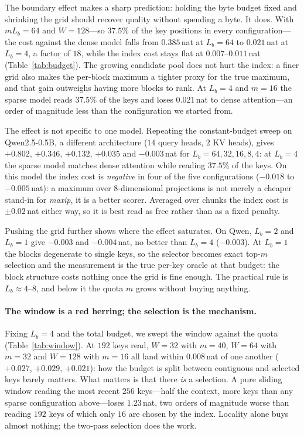 \documentclass[sigconf,nonacm,11pt]{acmart}
\begin{document}
The boundary effect makes a sharp prediction: holding the byte budget fixed and
shrinking the grid should recover quality without spending a byte. It does. With
$m L_b=64$ and $W=128$---so $37.5\%$ of the key positions in every
configuration---the cost against the dense model falls from $0.385$\,nat at
$L_b=64$ to $0.021$\,nat at $L_b=4$, a factor of $18$, while the index cost stays
flat at $0.007$--$0.011$\,nat (Table~\ref{tab:budget}). The growing candidate pool
does not hurt the index: a finer grid also makes the per-block maximum a tighter
proxy for the true maximum, and that gain outweighs having more blocks to rank. At
$L_b=4$ and $m=16$ the sparse model reads $37.5\%$ of the keys and loses
$0.021$\,nat to dense attention---an order of magnitude less than the
configuration we started from.

The effect is not specific to one model. Repeating the constant-budget sweep on
Qwen2.5-0.5B, a different architecture ($14$ query heads, $2$ KV heads), gives
$+0.802$, $+0.346$, $+0.132$, $+0.035$ and $-0.003$\,nat for
$L_b=64,32,16,8,4$: at $L_b=4$ the sparse model matches dense attention while
reading $37.5\%$ of the keys. On this model the index cost is \emph{negative} in
four of the five configurations ($-0.018$ to $-0.005$\,nat): a maximum over
$8$-dimensional projections is not merely a cheaper stand-in for \emph{maxip}, it
is a better scorer. Averaged over chunks the index cost is $\pm0.02$\,nat either
way, so it is best read as free rather than as a fixed penalty.

Pushing the grid further shows where the effect saturates. On Qwen, $L_b=2$ and
$L_b=1$ give $-0.003$ and $-0.004$\,nat, no better than $L_b=4$ ($-0.003$). At
$L_b=1$ the blocks degenerate to single keys, so the selector becomes exact
top-$m$ selection and the measurement is the true per-key oracle at that budget:
the block structure costs nothing once the grid is fine enough. The practical rule
is $L_b\approx4$--$8$, and below it the quota $m$ grows without buying anything.

\paragraph{The window is a red herring; the selection is the mechanism.} Fixing
$L_b=4$ and the total budget, we swept the window against the quota
(Table~\ref{tab:window}). At $192$ keys read, $W=32$ with $m=40$, $W=64$ with
$m=32$ and $W=128$ with $m=16$ all land within $0.008$\,nat of one another
($+0.027$, $+0.029$, $+0.021$): how the budget is split between contiguous and
selected keys barely matters. What matters is that there \emph{is} a selection. A
pure sliding window reading the most recent $256$ keys---half the context, more
keys than any sparse configuration above---loses $1.23$\,nat, two orders of
magnitude worse than reading $192$ keys of which only $16$ are chosen by the
index. Locality alone buys almost nothing; the two-pass selection does the work.
\end{document}
